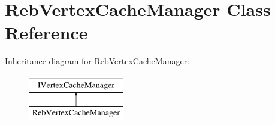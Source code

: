 \hypertarget{class_reb_vertex_cache_manager}{}\section{Reb\+Vertex\+Cache\+Manager Class Reference}
\label{class_reb_vertex_cache_manager}
Inheritance diagram for Reb\+Vertex\+Cache\+Manager\+:\begin{figure}[H]
\begin{center}
\leavevmode
\includegraphics[height=2.000000cm]{class_reb_vertex_cache_manager}
\end{center}
\end{figure}
